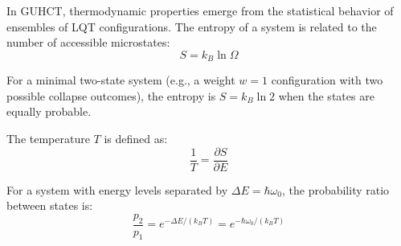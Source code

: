 \documentclass[11pt,a4paper]{article}
\makeatletter
\renewenvironment{proof}[1][\proofname]{\par
  \pushQED{\qed}%
  \normalfont \topsep6\p@\@plus6\p@\relax
  \trivlist
  \item[\hskip\labelsep
        \itshape
    #1\@addpunct{.}]\ignorespaces
}{%
  \popQED\endtrivlist\@endpefalse
}
\makeatother
\begin{document}
\begin{proof}
In GUHCT, thermodynamic properties emerge from the statistical behavior of ensembles of LQT configurations. The entropy of a system is related to the number of accessible microstates:
\begin{equation}
S = k_B \ln \Omega
\label{eq:entropy_boltzmann} %
\end{equation}

For a minimal two-state system (e.g., a weight $w=1$ configuration with two possible collapse outcomes), the entropy is $S = k_B \ln 2$ when the states are equally probable.

The temperature $T$ is defined as:
\begin{equation}
\frac{1}{T} = \frac{\partial S}{\partial E}
\label{eq:temp_def_entropy} %
\end{equation}

For a system with energy levels separated by $\Delta E = \hbar \omega_0$, the probability ratio between states is:
\begin{equation}
\frac{p_2}{p_1} = e^{-\Delta E / (k_B T)} = e^{-\hbar \omega_0 / (k_B T)}
\label{eq:prob_ratio_boltzmann} %
\end{equation}


\end{proof}
\end{document}
